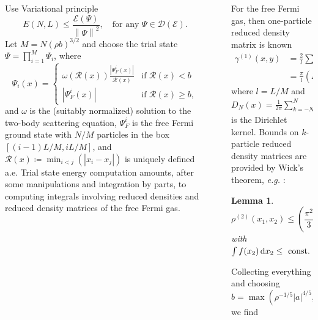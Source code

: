 \documentclass[final]{beamer}
\newcommand{\euler}[1]{\text{e}^{#1}}
\newcommand{\norm}[1]{\left\lVert #1 \right\rVert}
\newcommand{\abs}[1]{\left\lvert #1 \right\rvert}
\newcommand*\diff{\mathop{}\!\mathrm{d}}
\newcommand{\eg}{\emph{e.g.} }
\newcommand{\rr}{\mathcal{R}}
\newtheorem{mlemma}{Lemma}
\newlength{\sepwidth}
\newlength{\colwidth}
\newlength{\sepwidthh}
\newcommand{\separatorcolumnn}{\begin{column}{\sepwidthh}\end{column}}
\begin{document}
\begin{frame}[t]
\begin{columns}[t]
\begin{column}{\colwidth}
		\begin{tcolorbox}[colframe=qmathblue,colback=qmathbluelyslyslys,title=Upper bound proof sketch]
			Use Variational principle
			$$
			E(N,L)\leq \frac{\mathcal{E}(\Psi)}{\norm{\Psi}^2},\quad \text{for any }  \Psi\in \mathcal{D}(\mathcal{E}) .
			$$
			Let $ M=N(\rho b)^{3/2} $ and choose the trial state $ \Psi=\prod_{i=1}^{M}\Psi_i $, where \begin{equation}
				\Psi_i(x)=\begin{cases}
				\omega(\rr(x))\frac{\abs{\Psi^i_F(x)}}{\rr(x)}& \text{if }\rr(x)<b\\
				\abs{\Psi^i_F(x)}&\text{if }\rr(x)\geq b,
				\end{cases}
			\end{equation}
			and $ \omega $ is the (suitably normalized) solution to the two-body scattering equation,  $\Psi^i_F$ is the free Fermi ground state with $ N/M $ particles in the box $ [(i-1)L/M,iL/M] $, and $ \rr(x)\coloneqq \min_{i<j}(\abs{x_i-x_j}) $ is uniquely defined a.e. Trial state energy computation amounts, after some manipulations and integration by parts, to computing integrals involving reduced densities and reduced density matrices of the free Fermi gas.
		\end{tcolorbox}
		\end{column}
	\separatorcolumnn

	\begin{column}{\colwidth}
		\begin{tcolorbox}[colframe=qmathblue,colback=qmathbluelyslyslys,title=Upper bound proof sketch]
			For the free Fermi gas, then one-particle reduced density matrix is known
			\begin{equation}
			\begin{aligned}
			\gamma^{(1)}(x,y)&=\frac{2}{l}\sum_{j=1}^{N}\sin\left(\frac{\pi}{l}jx\right)\sin\left(\frac{\pi}{l} jy\right)\\
			&=\frac{\pi}{l}\left(D_{N}\left(\pi\frac{x-y}{l}\right)+D_{N}\left(\pi\frac{x+y}{l}\right)\right),
			\end{aligned}
			\end{equation}
			where $ l=L/M $ and $ D_N(x)=\frac{1}{2\pi}\sum_{k=-N}^{N}\euler{ikx}=\frac{\sin((N+1/2)x)}{2\pi\sin(x/2)} $ is the Dirichlet kernel.
			Bounds on $ k $-particle reduced density matrices are provided by Wick's theorem, \eg:
			\begin{mlemma}\label{Lemma rho2 bound}
				$$ \rho^{(2)}(x_1,x_2)\leq\left(\frac{\pi^2}{3}\rho^4+f(x_2)\right)(x_1-x_2)^2+\mathcal{O}(\rho^6(x_1-x_2)^4), $$ 
				with $ \int f(x_2)\diff x_2\leq \textnormal{ const. }\rho^3\log(N). $
			\end{mlemma}
			Collecting everything and choosing $ b=\max(\rho^{-1/5}\abs{a}^{4/5}, R_0) $ we find
			

\end{tcolorbox}
\end{column}
\end{columns}
\end{frame}
\end{document}
